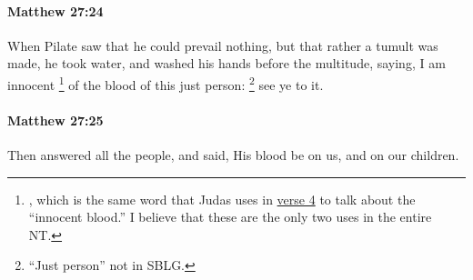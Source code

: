 		\paragraph{Matthew 27:24} %
			\label{MATTHEW-27-24}

			When Pilate saw that he could prevail nothing, but that rather a tumult was made, he took water, and washed his hands before the multitude, saying, I am innocent%
				\footnote{%
					, which is the same word that Judas uses in \hyperref[MATTHEW-27-4]{verse 4} to talk about the ``innocent blood.'' I believe that these are the only two uses in the entire NT.
					}
			of the blood of this just person:%
				\footnote{%
					``Just person'' not in SBLG.
					} 
			see ye to it.

			\begin{framed}
			\scriptsize
				\begin{compactdesc}
					\item[SBLG] 
				\end{compactdesc}
			\end{framed}

		\paragraph{Matthew 27:25} %
			\label{MATTHEW-27-25}

			Then answered all the people, and said, His blood be on us, and on our children.

